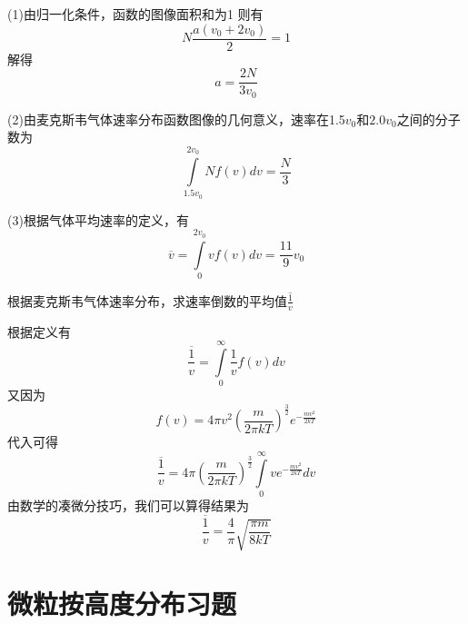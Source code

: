 \documentclass[lang=cn,10pt]{elegantbook}
\begin{document}
	\begin{solution}
		(1)由归一化条件，函数的图像面积和为1
		则有
		\begin{equation*}
			N\frac{a(v_{0}+2v_{0})}{2}=1
		\end{equation*}
		解得\begin{equation*}
			a=\frac{2N}{3v_{0}}
		\end{equation*}
		
		(2)由麦克斯韦气体速率分布函数图像的几何意义，速率在1.5$v_{0}$和$2.0v_{0}$之间的分子数为
		\begin{equation*}
			\int\limits_{1.5v_0}^{2v_{0}}{Nf\left( v \right) dv}=\frac{N}{3}
		\end{equation*}
		
		(3)根据气体平均速率的定义，有
		\begin{equation*}
			\overline{v}=\int\limits_{0}^{2v_{0}}{vf\left( v \right) dv}=\frac{11}{9}v_{0}
		\end{equation*}
	\end{solution}
	
	\begin{example}
		根据麦克斯韦气体速率分布，求速率倒数的平均值$\overline{\frac{1}{v}}$
	\end{example}
	\begin{solution}
		根据定义有
		\begin{equation*}
			\overline{\frac{1}{v}}=\int\limits_0^{\infty}{\frac{1}{v}f\left( v \right) dv}
		\end{equation*}
		又因为
		\begin{equation*}
			f\left( v \right) =4\pi v^2\left( \frac{m}{2\pi kT} \right) ^{\frac{3}{2}}e^{-\frac{mv^2}{2kT}}
		\end{equation*}
		代入可得
		\begin{equation*}
			\overline{\frac{1}{v}}=4\pi \left( \frac{m}{2\pi kT} \right) ^{\frac{3}{2}}\int\limits_0^{\infty}{ve^{-\frac{mv^2}{2kT}}dv}
		\end{equation*}
		由数学的凑微分技巧，我们可以算得结果为
		\begin{equation*}
			\overline{\frac{1}{v}}=\frac{4}{\pi}\sqrt{\frac{\pi m}{8kT}}
		\end{equation*}
	\end{solution}

	
	\section{微粒按高度分布习题}
	
\end{document}
